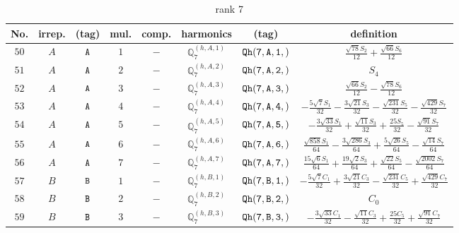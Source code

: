 \documentclass[fleqn,8pt]{jsarticle}
\begin{document}
\begin{table}[ht!]
\begin{center}
\caption{rank 7}
\renewcommand{\arraystretch}{1.3}
\begin{tabular}{cccccccc} \hline \hline
No. & irrep. & (tag) & mul. & comp. & harmonics & (tag) & definition \\ \hline
$ 50 $ & $ A $ & $ {\tt A} $ & $ 1 $ & $ - $ & $ \mathbb{Q}_{7}^{(h,A,1)} $ & $ {\tt Qh(7,A,1,)} $ & $ \frac{\sqrt{78} S_{2}}{12} + \frac{\sqrt{66} S_{6}}{12} $ \\
$ 51 $ & $ A $ & $ {\tt A} $ & $ 2 $ & $ - $ & $ \mathbb{Q}_{7}^{(h,A,2)} $ & $ {\tt Qh(7,A,2,)} $ & $ S_{4} $ \\
$ 52 $ & $ A $ & $ {\tt A} $ & $ 3 $ & $ - $ & $ \mathbb{Q}_{7}^{(h,A,3)} $ & $ {\tt Qh(7,A,3,)} $ & $ \frac{\sqrt{66} S_{2}}{12} - \frac{\sqrt{78} S_{6}}{12} $ \\
$ 53 $ & $ A $ & $ {\tt A} $ & $ 4 $ & $ - $ & $ \mathbb{Q}_{7}^{(h,A,4)} $ & $ {\tt Qh(7,A,4,)} $ & $ - \frac{5 \sqrt{7} S_{1}}{32} - \frac{3 \sqrt{21} S_{3}}{32} - \frac{\sqrt{231} S_{5}}{32} - \frac{\sqrt{429} S_{7}}{32} $ \\
$ 54 $ & $ A $ & $ {\tt A} $ & $ 5 $ & $ - $ & $ \mathbb{Q}_{7}^{(h,A,5)} $ & $ {\tt Qh(7,A,5,)} $ & $ - \frac{3 \sqrt{33} S_{1}}{32} + \frac{\sqrt{11} S_{3}}{32} + \frac{25 S_{5}}{32} - \frac{\sqrt{91} S_{7}}{32} $ \\
$ 55 $ & $ A $ & $ {\tt A} $ & $ 6 $ & $ - $ & $ \mathbb{Q}_{7}^{(h,A,6)} $ & $ {\tt Qh(7,A,6,)} $ & $ \frac{\sqrt{858} S_{1}}{64} - \frac{3 \sqrt{286} S_{3}}{64} + \frac{5 \sqrt{26} S_{5}}{64} - \frac{\sqrt{14} S_{7}}{64} $ \\
$ 56 $ & $ A $ & $ {\tt A} $ & $ 7 $ & $ - $ & $ \mathbb{Q}_{7}^{(h,A,7)} $ & $ {\tt Qh(7,A,7,)} $ & $ \frac{15 \sqrt{6} S_{1}}{64} + \frac{19 \sqrt{2} S_{3}}{64} + \frac{\sqrt{22} S_{5}}{64} - \frac{\sqrt{2002} S_{7}}{64} $ \\
$ 57 $ & $ B $ & $ {\tt B} $ & $ 1 $ & $ - $ & $ \mathbb{Q}_{7}^{(h,B,1)} $ & $ {\tt Qh(7,B,1,)} $ & $ - \frac{5 \sqrt{7} C_{1}}{32} + \frac{3 \sqrt{21} C_{3}}{32} - \frac{\sqrt{231} C_{5}}{32} + \frac{\sqrt{429} C_{7}}{32} $ \\
$ 58 $ & $ B $ & $ {\tt B} $ & $ 2 $ & $ - $ & $ \mathbb{Q}_{7}^{(h,B,2)} $ & $ {\tt Qh(7,B,2,)} $ & $ C_{0} $ \\
$ 59 $ & $ B $ & $ {\tt B} $ & $ 3 $ & $ - $ & $ \mathbb{Q}_{7}^{(h,B,3)} $ & $ {\tt Qh(7,B,3,)} $ & $ - \frac{3 \sqrt{33} C_{1}}{32} - \frac{\sqrt{11} C_{3}}{32} + \frac{25 C_{5}}{32} + \frac{\sqrt{91} C_{7}}{32} $ \\

\end{tabular}
\end{center}
\end{table}
\end{document}
